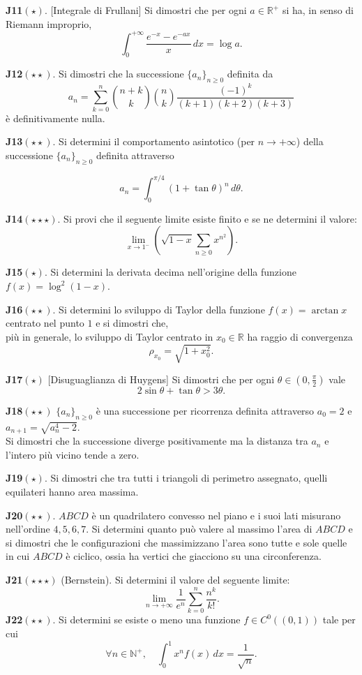 \documentclass[a4paper,twoside]{article}
\theoremstyle{definition}
\numberwithin{theorem}{section}
\begin{document}
\textbf{J11}$(\star)$. [Integrale di Frullani] Si dimostri che per ogni $a\in\mathbb{R}^+$ si ha, in senso di Riemann improprio,
$$ \int_{0}^{+\infty}\frac{e^{-x}-e^{-ax}}{x}\,dx = \log a.$$

\textbf{J12}$(\star\star)$. Si dimostri che la successione $\{a_n\}_{n\geq 0}$ definita da
$$ a_n = \sum_{k=0}^{n}\binom{n+k}{k}\binom{n}{k}\frac{(-1)^k}{(k+1)(k+2)(k+3)} $$
è definitivamente nulla.

\textbf{J13}$(\star\star)$. Si determini il comportamento asintotico (per $n\to +\infty$) della successione $\{a_n\}_{n\geq 0}$ definita attraverso

$$ a_n = \int_{0}^{\pi/4}\left(1+\tan\theta\right)^n\,d\theta. $$

\textbf{J14}$(\star\star\star)$. Si provi che il seguente limite esiste finito e se ne determini il valore:
$$ \lim_{x\to 1^-}\left(\sqrt{1-x}\sum_{n\geq 0}x^{n^2}\right).$$

\textbf{J15}$(\star)$. Si determini la derivata decima nell'origine della funzione $f(x)=\log^2(1-x)$.

\textbf{J16}$(\star\star)$. Si determini lo sviluppo di Taylor della funzione $f(x)=\arctan x$ centrato nel punto $1$ e si dimostri che,\\ più in generale, lo sviluppo di Taylor centrato in $x_0\in\mathbb{R}$ ha raggio di convergenza 
$$ \rho_{x_0} = \sqrt{1+x_0^2}. $$

{\label{J17}\textbf{J17}}$(\star)$ [Disuguaglianza di Huygens] Si dimostri che per ogni $\theta\in\left(0,\frac{\pi}{2}\right)$ vale
$$ 2\sin\theta + \tan\theta > 3\theta.$$

\textbf{J18}$(\star\star)$ $\{a_n\}_{n\geq 0}$ è una successione per ricorrenza definita attraverso $a_0=2$ e $a_{n+1}=\sqrt{a_n^4-2}$.\\ Si dimostri che la successione diverge positivamente ma la distanza tra $a_n$ e l'intero più vicino tende a zero.

\textbf{J19}$(\star)$. Si dimostri che tra tutti i triangoli di perimetro assegnato, quelli equilateri hanno area massima. 

\textbf{J20}$(\star\star)$. $ABCD$ è un quadrilatero convesso nel piano e i suoi lati misurano nell'ordine $4,5,6,7$. Si determini quanto può valere al massimo l'area di $ABCD$ e si dimostri che le configurazioni che massimizzano l'area sono tutte e sole quelle in cui $ABCD$ è ciclico, ossia ha vertici che giacciono su una circonferenza.

\textbf{J21}$(\star\star\star)$ (Bernstein). Si determini il valore del seguente limite: 
$$ \lim_{n\to +\infty} \frac{1}{e^n}\sum_{k=0}^{n}\frac{n^k}{k!}.$$
\textbf{J22}$(\star\star)$. Si determini se esiste o meno una funzione $f\in C^0((0,1))$ tale per cui
$$ \forall n\in\mathbb{N}^+,\quad \int_{0}^{1} x^n f(x)\,dx = \frac{1}{\sqrt{n}}. $$
\end{document}
